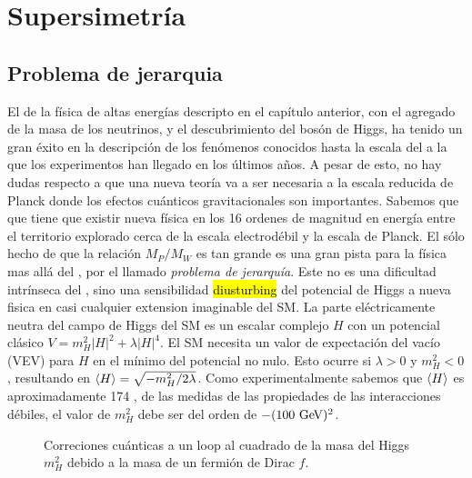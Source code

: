 \chapter{Supersimetría}


\section{Problema de jerarquia}

El {\SM} de la física de altas energías descripto en el capítulo anterior,
con el agregado de la masa de los neutrinos, y el descubrimiento del bosón
de Higgs, ha tenido un gran éxito en la descripción de los fenómenos
conocidos hasta la escala del {\tev} a la que los experimentos han llegado
en los últimos a\~nos.
A pesar de esto, no hay dudas respecto a que una nueva teor\'ia va a ser
necesaria a la escala reducida de Planck %
donde los efectos cu\'anticos gravitacionales son importantes. Sabemos que
que tiene que existir nueva f\'isica en los 16 ordenes de magnitud en
energ\'ia entre el territorio explorado cerca de la escala electrod\'ebil
y la escala de Planck.
El s\'olo hecho de que la relación $M_P/M_W$ es tan grande es una gran pista
para la física mas allá del {\SM}, por el llamado \emph{problema de jerarquía}.
Este no es una dificultad intrínseca del {\SM}, sino una sensibilidad \hl{diusturbing}
del potencial de Higgs a nueva fisica en casi cualquier extension imaginable
del SM.
La parte eléctricamente neutra del campo de Higgs del SM es un escalar complejo
$H$ con un potencial clásico $V=m_H^2 |H|^2 + \lambda|H|^4$.
El SM necesita un valor de expectación del vacío (VEV) para $H$ en el
mínimo del potencial no nulo.
Esto ocurre si $\lambda>0$ y $m_H^2<0$, resultando en
$\langle H \rangle = \sqrt{-m_H^2/2\lambda}$.
Como experimentalmente sabemos que $\langle H \rangle$ es aproximadamente 174 \gev,
de las medidas de las propiedades de las interacciones débiles, el valor de
$m_H^2$ debe ser del orden de $-(100 \gev)^2$.

\begin{figure}[h]
  \centering
  
  \caption{Correciones cu\'anticas a un loop al cuadrado de la masa del Higgs
    $m_H^2$ debido a la masa de un fermi\'on de Dirac $f$.}
  \label{fig:higgs_correction_f}
\end{figure}

